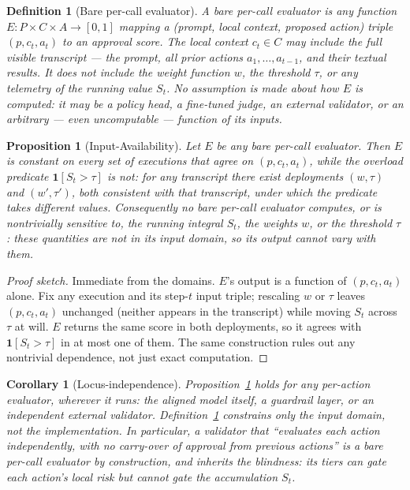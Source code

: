 \documentclass[11pt]{article}
\newtheorem{proposition}{Proposition}[section]
\newtheorem{corollary}{Corollary}[proposition]
\newtheorem{definition}{Definition}[section]
\begin{document}
\begin{definition}[Bare per-call evaluator]
\label{def:bare-evaluator}
A \emph{bare per-call evaluator} is any function $E: P \times C \times A \to [0,1]$ mapping a (prompt, local context, proposed action) triple $(p, c_t, a_t)$ to an approval score. The local context $c_t \in C$ may include the full visible transcript --- the prompt, all prior actions $a_1,\ldots,a_{t-1}$, and their textual results. It does not include the weight function $w$, the threshold $\tau$, or any telemetry of the running value $S_t$. No assumption is made about how $E$ is computed: it may be a policy head, a fine-tuned judge, an external validator, or an arbitrary --- even uncomputable --- function of its inputs.
\end{definition}

\begin{proposition}[Input-Availability]
\label{prop:input-availability}
Let $E$ be any bare per-call evaluator. Then $E$ is constant on every set of executions that agree on $(p, c_t, a_t)$, while the overload predicate $\mathbf{1}[S_t > \tau]$ is not: for any transcript there exist deployments $(w, \tau)$ and $(w', \tau')$, both consistent with that transcript, under which the predicate takes different values. Consequently no bare per-call evaluator computes, or is nontrivially sensitive to, the running integral $S_t$, the weights $w$, or the threshold $\tau$: these quantities are not in its input domain, so its output cannot vary with them.
\end{proposition}

\begin{proof}[Proof sketch]
Immediate from the domains. $E$'s output is a function of $(p, c_t, a_t)$ alone. Fix any execution and its step-$t$ input triple; rescaling $w$ or $\tau$ leaves $(p, c_t, a_t)$ unchanged (neither appears in the transcript) while moving $S_t$ across $\tau$ at will. $E$ returns the same score in both deployments, so it agrees with $\mathbf{1}[S_t > \tau]$ in at most one of them. The same construction rules out any nontrivial dependence, not just exact computation.
\end{proof}

\begin{corollary}[Locus-independence]
\label{cor:locus}
Proposition~\ref{prop:input-availability} holds for \emph{any} per-action evaluator, wherever it runs: the aligned model itself, a guardrail layer, or an independent external validator. Definition~\ref{def:bare-evaluator} constrains only the input domain, not the implementation. In particular, a validator that ``evaluates each action independently, with no carry-over of approval from previous actions'' \citep{fokou2026parallax} is a bare per-call evaluator by construction, and inherits the blindness: its tiers can gate each action's local risk but cannot gate the accumulation $S_t$.
\end{corollary}
\end{document}
